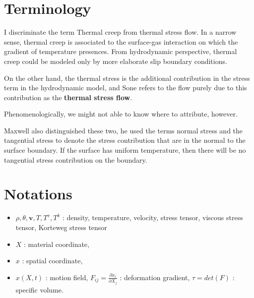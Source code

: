\documentclass[a4paper,12pt]{article}
\begin{document}
\tableofcontents

\section{Terminology}
I discriminate the term Thermal creep from thermal stress flow. In a narrow sense, thermal creep is associated to the surface-gas interaction on which the gradient of temperature presences. From hydrodynamic perspective, thermal creep could be modeled only by more elaborate slip boundary conditions. %

On the other hand, the thermal stress is the additional contribution in the stress term in the hydrodynamic model, and Sone refers to the flow purely due to this contribution as the  {\bf thermal stress flow}.

Phenomenologically, we might not able to know where to attribute, however.

Maxwell also distinguished these two, he used the terms normal stress and the tangential stress to denote the stress contribution that are in the normal to the surface boundary. If the surface has uniform temperature, then there will be no tangential stress contribution on the boundary.

\section{Notations}
\begin{itemize}
 \item {{{ $\rho, \theta , \mathbf{v}, T, T^v, T^k$ }}} : density, temperature, velocity, stress tensor, viscous stress tensor, Korteweg stress tensor
 \item $X$ : material coordinate,
 \item $x$ : spatial coordinate,
 \item $x(X,t)$ : motion field, {{{$F_{ij} = \frac{\partial x_i}{\partial X_j}$}}} : deformation gradient, $\tau = det(F) $ : specific volume.
\end{itemize}
\end{document}
